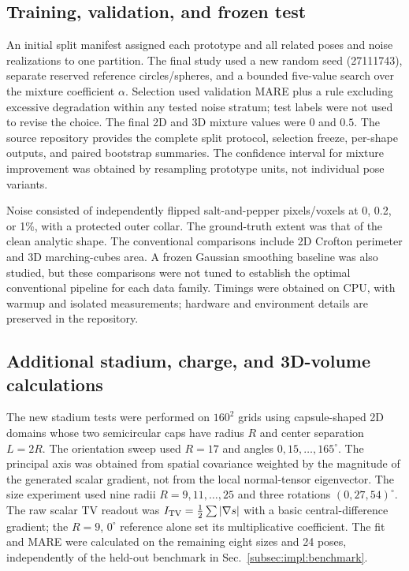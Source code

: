\documentclass[11pt,a4paper]{article}
\begin{document}
\subsection{Training, validation, and frozen test}
An initial split manifest assigned each prototype and all related poses and noise realizations to one partition. The final study used a new random seed (27111743), separate reserved reference circles/spheres, and a bounded five-value search over the mixture coefficient \(\alpha\). Selection used validation MARE plus a rule excluding excessive degradation within any tested noise stratum; test labels were not used to revise the choice. The final 2D and 3D mixture values were \(0\) and \(0.5\). The source repository provides the complete split protocol, selection freeze, per-shape outputs, and paired bootstrap summaries. The confidence interval for mixture improvement was obtained by resampling prototype units, not individual pose variants.

Noise consisted of independently flipped salt-and-pepper pixels/voxels at 0, 0.2, or 1\%, with a protected outer collar. The ground-truth extent was that of the clean analytic shape. The conventional comparisons include 2D Crofton perimeter and 3D marching-cubes area. A frozen Gaussian smoothing baseline was also studied, but these comparisons were not tuned to establish the optimal conventional pipeline for each data family. Timings were obtained on CPU, with warmup and isolated measurements; hardware and environment details are preserved in the repository.

\subsection{Additional stadium, charge, and 3D-volume calculations}
The new stadium tests were performed on $160^2$ grids using capsule-shaped 2D domains whose two semicircular caps have radius $R$ and center separation $L=2R$. The orientation sweep used $R=17$ and angles $0,15,\ldots,165^\circ$. The principal axis was obtained from spatial covariance weighted by the magnitude of the generated scalar gradient, not from the local normal-tensor eigenvector. The size experiment used nine radii $R=9,11,\ldots,25$ and three rotations $(0,27,54)^\circ$. The raw scalar TV readout was $I_{\rm TV}=\frac12\sum|\nabla s|$ with a basic central-difference gradient; the $R=9$, $0^\circ$ reference alone set its multiplicative coefficient. The fit and MARE were calculated on the remaining eight sizes and 24 poses, independently of the held-out benchmark in Sec.~\ref{subsec:impl:benchmark}.
\end{document}
